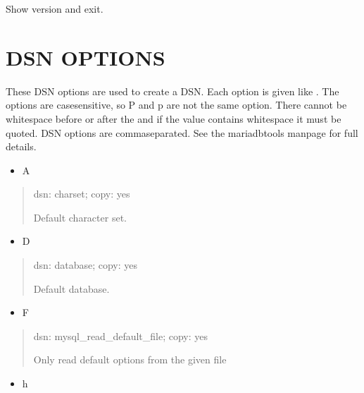 \documentclass[letterpaper,10pt,english]{sphinxmanual}
\begin{document}
\begin{fulllineitems}
\label{\detokenize{mariadb-index-checker:cmdoption-mariadb-index-checker-version}}
Show version and exit.

\end{fulllineitems}



\section{DSN OPTIONS}
\label{\detokenize{mariadb-index-checker:dsn-options}}
These DSN options are used to create a DSN.  Each option is given like
.  The options are case\sphinxhyphen{}sensitive, so P and p are not the
same option.  There cannot be whitespace before or after the \sphinxcode{\sphinxupquote{=}} and
if the value contains whitespace it must be quoted.  DSN options are
comma\sphinxhyphen{}separated.  See the mariadb\sphinxhyphen{}tools manpage for full details.
\begin{itemize}
\item {} 
A

\end{itemize}
\begin{quote}

dsn: charset; copy: yes

Default character set.
\end{quote}
\begin{itemize}
\item {} 
D

\end{itemize}
\begin{quote}

dsn: database; copy: yes

Default database.
\end{quote}
\begin{itemize}
\item {} 
F

\end{itemize}
\begin{quote}

dsn: mysql\_read\_default\_file; copy: yes

Only read default options from the given file
\end{quote}
\begin{itemize}
\item {} 
h

\end{itemize}
\end{document}
